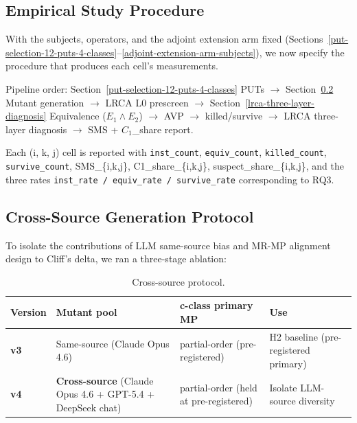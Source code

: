 \documentclass[manuscript,screen,review]{acmart}
\begin{document}
\subsection{Empirical Study Procedure}\label{procedure-overview}

With the subjects, operators, and the adjoint extension arm fixed
(Sections~\ref{put-selection-12-puts-4-classes}--\ref{adjoint-extension-arm-subjects}), we now specify the procedure that produces each cell's
measurements.

\noindent\textsf{\small Pipeline order: Section~\ref{put-selection-12-puts-4-classes} PUTs $\to$ Section~\ref{cross-source-v4-protocol-summary} Mutant generation $\to$ LRCA L0 prescreen $\to$ Section~\ref{lrca-three-layer-diagnosis} Equivalence ($E_1 \wedge E_2$) $\to$ AVP $\to$ killed/survive $\to$ LRCA three-layer diagnosis $\to$ SMS + $C_1$\_share report.}

Each (i, k, j) cell is reported with \texttt{inst\_count},
\texttt{equiv\_count}, \texttt{killed\_count}, \texttt{survive\_count},
SMS\_\{i,k,j\}, C1\_share\_\{i,k,j\}, suspect\_share\_\{i,k,j\}, and the
three rates \texttt{inst\_rate\ /\ equiv\_rate\ /\ survive\_rate}
corresponding to RQ3.

\subsection{Cross-Source Generation Protocol}\label{cross-source-v4-protocol-summary}

To isolate the contributions of LLM same-source bias and MR-MP alignment
design to Cliff's delta, we ran a three-stage ablation:

{%
\begin{longtable}[]{@{}
  >{\raggedright\arraybackslash}p{}
  >{\raggedright\arraybackslash}p{}
  >{\raggedright\arraybackslash}p{}
  >{\raggedright\arraybackslash}p{}@{}}
\caption{Cross-source protocol.}\label{tab:p2-06}\\
\toprule\noalign{}
\begin{minipage}[b]{\linewidth}\raggedright
Version
\end{minipage} & \begin{minipage}[b]{\linewidth}\raggedright
Mutant pool
\end{minipage} & \begin{minipage}[b]{\linewidth}\raggedright
c-class primary MP
\end{minipage} & \begin{minipage}[b]{\linewidth}\raggedright
Use
\end{minipage} \\
\midrule\noalign{}
\endhead
\bottomrule\noalign{}
\endlastfoot
\textbf{v3} & Same-source (Claude Opus 4.6) & partial-order (pre-registered) & H2
baseline (pre-registered primary) \\
\textbf{v4} & \textbf{Cross-source} (Claude Opus 4.6 + GPT-5.4 +
DeepSeek chat) & partial-order (held at pre-registered) & Isolate LLM-source
diversity \\
\end{longtable}
}
\end{document}
